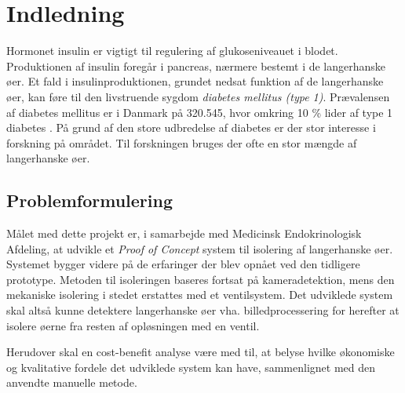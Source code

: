 \chapter{Indledning}
Hormonet insulin er vigtigt til regulering af glukoseniveauet i blodet. Produktionen af insulin foregår i pancreas, nærmere bestemt i de langerhanske øer. Et fald i insulinproduktionen, grundet nedsat funktion af de langerhanske øer, kan føre til den livstruende sygdom \textit{diabetes mellitus (type 1)}. Prævalensen af diabetes mellitus er i Danmark på 320.545, hvor omkring 10 \% lider af type 1 diabetes \citep{diabetes}. På grund af den store udbredelse af diabetes er der stor interesse i forskning på området. Til forskningen bruges der ofte en stor mængde af langerhanske øer. 





\section{Problemformulering}

Målet med dette projekt er, i samarbejde med Medicinsk Endokrinologisk Afdeling, at udvikle et \textit{Proof of Concept} system til isolering af langerhanske øer. Systemet bygger videre på de erfaringer der blev opnået ved den tidligere prototype. Metoden til isoleringen baseres fortsat på kameradetektion, mens den mekaniske isolering i stedet erstattes med et ventilsystem. Det udviklede system skal altså kunne detektere langerhanske øer vha. billedprocessering for herefter at isolere øerne fra resten af opløsningen med en ventil. 

Herudover skal en cost-benefit analyse være med til, at belyse hvilke økonomiske og kvalitative fordele det udviklede system kan have, sammenlignet med den anvendte manuelle metode.

